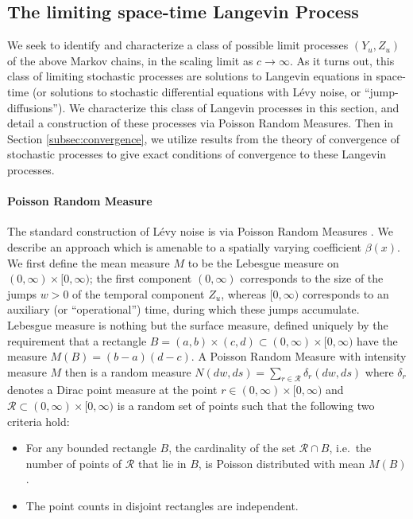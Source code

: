 \documentclass[a4paper,12pt]{elsarticle}
\numberwithin{equation}{section}
\theoremstyle{plain}
\theoremstyle{definition}
\theoremstyle{remark}
\numberwithin{equation}{section}
\newcommand{\1}{\mathbf 1}
\begin{document}
\subsection{The limiting space-time Langevin Process}

We seek to identify and characterize a class of possible limit processes
$(Y_u, Z_u)$ of the above Markov chains,
in the scaling limit as $c \to \infty$. As it turns out, this class of 
limiting stochastic processes are solutions to
Langevin equations in space-time (or solutions to stochastic differential
equations with L\'evy noise, or ``jump-diffusions'').
We characterize this class of Langevin processes in this section, and detail 
a construction of these processes via Poisson Random Measures.
Then in Section \ref{subsec:convergence}, we utilize results from the theory of
convergence of stochastic processes to give exact conditions of convergence
to these Langevin processes.

\paragraph{Poisson Random Measure}
The standard construction of L\'evy noise is via Poisson Random Measures
\cite{Applebaum}.  We describe an approach which is amenable to a 
spatially varying coefficient $\beta(x)$. 
We first define the mean measure $M$ to be the Lebesgue measure on 
$(0,\infty) \times [0,\infty)$; the first component $(0,\infty)$ corresponds 
to the size of the jumps $w > 0$ of the temporal component $Z_u$, whereas $[0,\infty)$
corresponds to an auxiliary (or ``operational'') time, during which these jumps accumulate. 
Lebesgue measure is nothing but the surface measure, defined uniquely by the requirement 
that a rectangle $B = (a,b) \times (c,d) \subset (0,\infty) \times [0,\infty)$
have the measure $M(B) = (b-a)(d-c)$.  
A Poisson Random Measure with intensity measure $M$ then is a random measure 
$N(dw, ds) = \sum_{r \in \mathcal R} \delta_{r}(dw, ds)$ where $\delta_r$ 
denotes a Dirac point measure at the point $r \in (0,\infty) \times [0,\infty)$
and $\mathcal R \subset (0,\infty) \times [0,\infty)$ is a random set of points 
such that the following two criteria hold: 
\begin{itemize}
  \item 
  For any bounded rectangle $B$, the cardinality of the set $\mathcal R \cap B$,
  i.e.\ the number of 
  points of $\mathcal R$ that lie in $B$, is Poisson distributed with mean 
  $M(B)$.
  \item
  The point counts in disjoint rectangles are independent. 
\end{itemize}
\end{document}
